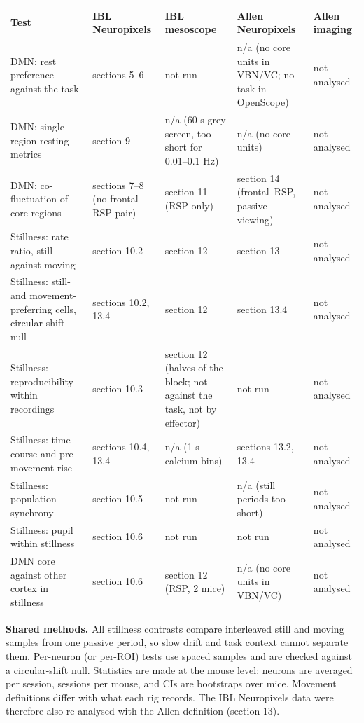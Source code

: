 \documentclass[10pt,a4paper]{article}
\begin{document}
{\small\renewcommand{\arraystretch}{1.2}
\begin{xltabular}{\linewidth}{>{\hsize\raggedright\arraybackslash}X>{\hsize\raggedright\arraybackslash}X>{\hsize\raggedright\arraybackslash}X>{\hsize\raggedright\arraybackslash}X>{\hsize\raggedright\arraybackslash}X}
\toprule
\textbf{Test} & \textbf{IBL Neuropixels} & \textbf{IBL mesoscope} & \textbf{Allen Neuropixels} & \textbf{Allen imaging} \\
\midrule
\endhead
DMN: rest preference against the task & sections 5--6 & not run & n/a (no core units in VBN/VC; no task in OpenScope) & not analysed \\
DMN: single-region resting metrics & section 9 & n/a (60 s grey screen, too short for 0.01--0.1 Hz) & n/a (no core units) & not analysed \\
DMN: co-fluctuation of core regions & sections 7--8 (no frontal--RSP pair) & section 11 (RSP only) & section 14 (frontal--RSP, passive viewing) & not analysed \\
Stillness: rate ratio, still against moving & section 10.2 & section 12 & section 13 & not analysed \\
Stillness: still- and movement-preferring cells, circular-shift null & sections 10.2, 13.4 & section 12 & section 13.4 & not analysed \\
Stillness: reproducibility within recordings & section 10.3 & section 12 (halves of the block; not against the task, not by effector) & not run & not analysed \\
Stillness: time course and pre-movement rise & sections 10.4, 13.4 & n/a (1 s calcium bins) & sections 13.2, 13.4 & not analysed \\
Stillness: population synchrony & section 10.5 & not run & n/a (still periods too short) & not analysed \\
Stillness: pupil within stillness & section 10.6 & not run & not run & not analysed \\
DMN core against other cortex in stillness & section 10.6 & section 12 (RSP, 2 mice) & n/a (no core units in VBN/VC) & not analysed \\
\bottomrule
\end{xltabular}}

\textbf{Shared methods.} All stillness contrasts compare interleaved still and moving samples from one passive period, so slow drift and task context cannot separate them. Per-neuron (or per-ROI) tests use spaced samples and are checked against a circular-shift null. Statistics are made at the mouse level: neurons are averaged per session, sessions per mouse, and CIs are bootstraps over mice. Movement definitions differ with what each rig records. The IBL Neuropixels data were therefore also re-analysed with the Allen definition (section 13).
\end{document}
